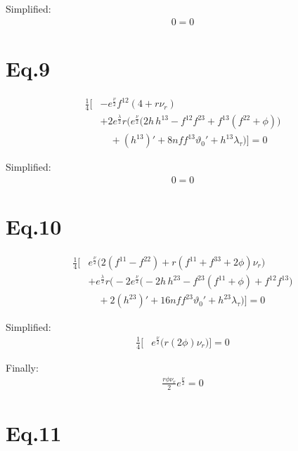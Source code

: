 \documentclass[12pt]{article}
\begin{document}
Simplified:
\begin{align*}
  0 = 0
\end{align*}

\section*{Eq.9}

\begin{align*}
\frac{1}{4} \Big[
 & - e^{\frac{\nu}{2}} f^{12} \left( 4 + r\nu_r \right) \\
 & + 2 e^{\frac{\lambda}{2}} r
   \Big(
     e^{\frac{\nu}{2}} \big(
       2h\,h^{13} - f^{12} f^{23} + f^{13}(f^{22} + \phi)
     \big) \\
     & \quad + (h^{13})'
     + 8 nf f^{13} \vartheta_0'
     + h^{13} \lambda_\tau
   \Big)
\Big] = 0
\end{align*}

Simplified:
\begin{align*}
  0 = 0
\end{align*}

\section*{Eq.10}

\begin{align*}
\frac{1}{4} \Big[
 & e^{\frac{\nu}{2}} \Big(
     2(f^{11} - f^{22}) + r(f^{11} + f^{33} + 2\phi)\nu_r
   \Big) \\
 & + e^{\frac{\lambda}{2}} r \Big(
     -2 e^{\frac{\nu}{2}} \Big(
       -2 h\, h^{23} - f^{23}(f^{11} + \phi) + f^{12} f^{13}
     \Big) \\
     & \quad + 2 (h^{23})'
     + 16 nf f^{23} \vartheta_0'
     + h^{23} \lambda_\tau
   \Big)
\Big] = 0
\end{align*}

Simplified:
\begin{align*}
\frac{1}{4} \Big[
 & e^{\frac{\nu}{2}} \Big(
     r(2\phi)\nu_r
   \Big)
\Big] = 0
\end{align*}

Finally:
\begin{align*}
\frac{r\phi\nu_r}{2} e^{\frac{\nu}{2}} = 0
\end{align*}

\section*{Eq.11}
\end{document}
